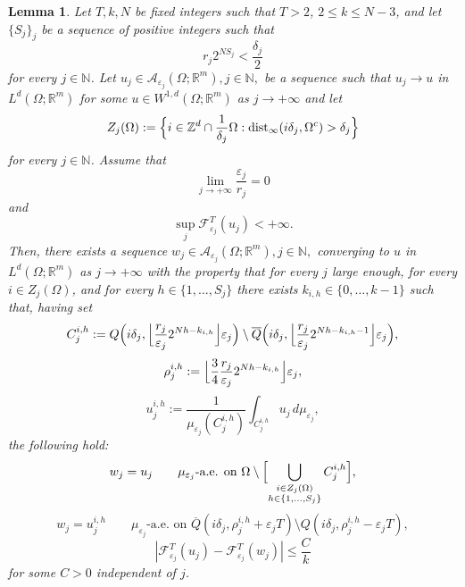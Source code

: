 \documentclass{article}
\theoremstyle{plain}
\newtheorem{lemma}[theorem]{Lemma}
\theoremstyle{definition}
\def\NN{{\mathbb N}}
\newcommand{\ej}{\varepsilon_j}
\newcommand{\rj}{r_j}
\newcommand{\dej}{\delta_j}
\newcommand{\F}{\mathcal{F}}
\newcommand{\Q}
{\overline{Q}}
\numberwithin{equation}{section}
\begin{document}
\begin{lemma}\label{lemma: joining}
Let $T,k,N$ be fixed integers such that $T>2$, $2\leq k\leq N-3$, and let $\{S_j\}_j$ be a sequence of positive integers such that
\begin{equation}\label{joining geo hyp}
\rj2^{NS_j}< \frac{\dej}{2} 
\end{equation}
for every $j\in\NN$. Let $u_j\in \mathcal{A}_{\varepsilon_j}(\Omega;\mathbb{R}^{m}),j\in\NN,$ be a sequence such that $u_j\rightarrow u$ in $L^{d}(\Omega;\mathbb{R}^{m})$ for some $u \in W^{1,d}(\Omega;\mathbb{R}^{m})$ as $j\to+\infty$ and let
\begin{equation}\label{insieme di indici}
    Z_{j}(\Omega):=\Bigl\{i \in \mathbb{Z}^{d}\cap \frac{1}{\delta_j}\Omega: \text{\rm dist}_\infty(i\delta_{j},\Omega^c)>\delta_j\Bigr\}
\end{equation}
for every $j\in\NN$. Assume that 
\begin{equation}\label{hp: e/r}
    \lim_{j\to+\infty}\frac{\ej}{\rj}=0
\end{equation}
and 
\begin{equation}\label{joining equibdd hyp}
\sup_{j}\F^T_{\ej}(u_j)<+\infty.
\end{equation}
Then, there exists a sequence $w_{j}\in \mathcal{A}_{\varepsilon_{j}}(\Omega;\mathbb{R}^{m}), j\in\NN,$ converging to $u$ in $L^{d}(\Omega;\mathbb{R}^{m})$ as $j\to+\infty$ with the property that for every $j$ large enough, for every $i \in Z_{j}(\Omega)$, and for every $h\in\{1,\dots,S_j\}$ there exists $k_{i,h} \in \{0,\dots, k-1\}$ such that, having set  
\begin{equation}
\label{def_cornici}
C^{i, h}_{j}:=Q\Bigl(i\delta_{j},\Bigl\lfloor\frac{\rj}{\varepsilon_{j}}2^{Nh-k_{i, h}}\Bigr\rfloor\varepsilon_{j}\Bigr)\setminus   \Q\Bigl(i\delta_{j},\Bigl\lfloor\frac{\rj}{\varepsilon_{j}}2^{Nh-k_{i,h}-1}\Bigr\rfloor\varepsilon_{j}\Bigr),
\end{equation}
\begin{equation*}
    \rho^{i, h}_{j}:=\Bigl\lfloor\frac{3}{4}\frac{\rj}{\varepsilon_{j}}2^{Nh-k_{i,h}}\Bigr\rfloor\varepsilon_{j},
\end{equation*}
\begin{equation*}
     u_{j}^{i, h}:=\frac{1}{\mu_{\ej} (C^{i,h}_j)}\int_{C^{i,h}_j} u_{j}\, d\mu_{\ej},
\end{equation*}
the following hold:
\begin{equation}\label{outcornici}
    w_{j}=u_{j}\qquad \mu_{\ej}  \text{-a.e. on } \Omega\setminus \Bigl[ \bigcup_{\substack{i \in Z_{j}(\Omega)\\ h\in\{1,\dots, S_j\}}}C_{j}^{i,h}\Bigr],
\end{equation}
\begin{equation}\label{bordointerno}
    w_{j}=u_{j}^{i, h}\qquad \mu_{\ej} \text{-a.e. on } \Q(i\delta_j,\rho^{i,h}_{j}+\varepsilon_j T)\setminus Q(i\delta_j,\rho^{i, h}_{j}-\varepsilon_j T),
\end{equation}
\begin{equation}\label{diffenergia}
    |\F^T_{\ej}(u_j)-\F^T_{\ej}(w_j)|\leq \frac{C}{k}
\end{equation}
for some $C>0$ independent of $j$.  
\end{lemma}
\end{document}
